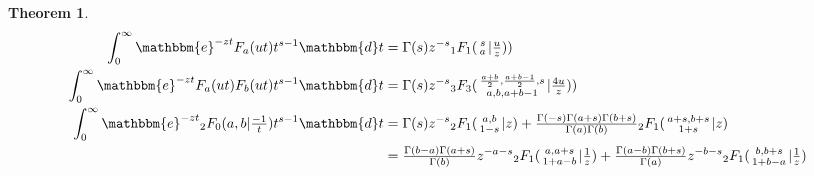 \documentclass[12pt]{article}
\newcommand{\ee}[0] {\mathbbm{e}}
\newcommand{\dd}[0] {\mathbbm{d}}
\numberwithin{equation}{section}
\newtheorem{theorem}{Theorem}[section]
\newcommand{\Head}[3] {{}_{#1}{#2}_{#3}}
\newcommand{\ArgS}[3] {( \begin{smallmatrix} #1 \\ #2 \end{smallmatrix} | {#3})}
\newcommand{\HypJ}[2] {F_{#1}(#2)}
\begin{document}
\begin{theorem}
\label{thm_int_ja}
\begin{align*}
\int_{0}^{\infty} \ee^{-z t} \HypJ{a}{u t} t^{s-1} \dd t & = \Gamma (s) z^{-s} \Head{1}{F}{1}\ArgS{s}{a}{\tfrac{u}{z}})\\
\int_{0}^{\infty} \ee^{-z t} \HypJ{a}{u t} \HypJ{b}{u t} t^{s-1} \dd t & = \Gamma (s) z^{-s} \Head{3}{F}{3}\ArgS{\frac{a+b}{2},\frac{a+b-1}{2},s}{a,b,a+b-1}{\tfrac{4u}{z}})\\
\int_{0}^{\infty} \ee^{-z t} \Head{2}{F}{0}(a,b|\tfrac{-1}{t}) t^{s-1} \dd t & = \Gamma (s) z^{-s} \Head{2}{F}{1} \ArgS{a,b}{1-s}{z}+\tfrac{\Gamma (-s) \Gamma (a+s) \Gamma (b+s)}{\Gamma (a) \Gamma(b)} \Head{2}{F}{1}\ArgS{a+s,b+s}{1+s}{z}\\
&= \tfrac{\Gamma(b-a) \Gamma(a+s)}{\Gamma(b)} z^{-a-s} \Head{2}{F}{1}\ArgS{a,a+s}{1+a-b}{\tfrac{1}{z}} + \tfrac{\Gamma(a-b)\Gamma (b+s)}{\Gamma (a)} z^{-b-s} \Head{2}{F}{1}\ArgS{b,b+s}{1+b-a}{\tfrac{1}{z}}
\end{align*}
\end{theorem}
\end{document}

